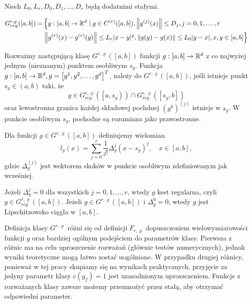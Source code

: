 \documentclass[oik, pdftex, robocza, man]{mgrwms}
\begin{document}
    Niech $L_{0}, L_{r}, D_{0}, D_{1}, \ldots, D_{r}$ będą dodatnimi stałymi.

    \begin{equation*}
        \begin{aligned}
        G_{reg}^{r, \varrho}([a, b])= &\left\{g:[a, b] \rightarrow \mathbb{R}^{d} \mid g \in C^{(r)}([a, b]),\left\|g^{(j)}(x)\right\| \leq D_{j}, j=0,1, \ldots, r\right. \\
                                      &\left.\left\|g^{(r)}(x)-g^{(r)}(y)\right\| \leq L_{r}|x-y|^{\varrho},\|g(y)-g(x)\| \leq L_{0}|y-x|, x,y \in [a, b]\right\}
        \end{aligned}
    \end{equation*}

    Rozważmy następującą klasę $G^{r, \varrho}([a, b])$ funkcji $g:[a, b] \rightarrow \mathbb{R}^{d}$ z co najwyżej jednym (nieznanym) punktem osobliwym $s_{g}$. Funkcja $g:[a, b] \rightarrow \mathbb{R}^{d}, g=\left[g^{1}, g^{2}, \ldots, g^{d}\right]^{T}$, należy do $G^{r, \varrho}([a, b])$, jeśli istnieje punkt $s_{g} \in (a, b)$ taki, że 
    $$
    g \in G_{reg}^{r, \varrho}\left(\left[a, s_{g}\right)\right) \cap G_{reg}^{r, \varrho}\left(\left[s_{g}, b\right]\right)
    $$
    oraz lewostronna granica każdej składowej pochdnej $\left(g^{k}\right)^{(j)}$ istnieje w $s_{g}$. W punkcie osobliwym $s_{g}$, pochodne są rozumiana jako prawostronne.
    
    Dla funkcji $g \in G^{r,\varrho}([a,b])$ definiujemy wielomian
    \begin{equation} \label{eq:26}
        l_{g}(x)=\sum_{j=0}^{r} \frac{1}{j !} \Delta_{g}^{j}\left(x-s_{g}\right)^{j}, \quad x \in [a, b],        
    \end{equation}
    gdzie $\Delta_{g}^{(j)}$ jest wektorem skoków w punkcie osobliwym zdefiniowanym jak wcześniej.

    Jeżeli $\Delta_{g}^{j}=0$ dla wszystkich $j=0,1, \ldots, r$, wtedy $g$ kest regularna, czyli $g \in G_{reg}^{r, \varrho}([a, b])$. Jeżeli $g \in G^{r, \varrho}([a, b])$ i $\Delta_{g}^{0}=0$, wtedy $g$ jest Lipschitzowsko ciągła w $[a, b]$.

    Definicja klasy $G^{r, \varrho}$ różni się od definicji  $F_{r, \varrho}$ dopuszczeniem wielowymiarowości funkcji $g$ oraz bardziej ogólnym podejściem do parametrów klasy. Pierwsza z różnic ma na celu uproszczenie rozważań (głównie testów numerycznych), jednak wyniki teoretyczne mogą łatwo zostać uogólnione. W przypadku drugiej różnicy, ponieważ w tej pracy skupiamy się na wynikach praktycznych, przyjęcie za jedyny parametr klasy $c(g_{f}) = 1$ jest uzasadnionym uproszczeniem. Funkcje z rozważanych klasy zawsze możemy przemnożyć przez stałą, aby otrzymać odpowiedni parameter.
    
\end{document}
